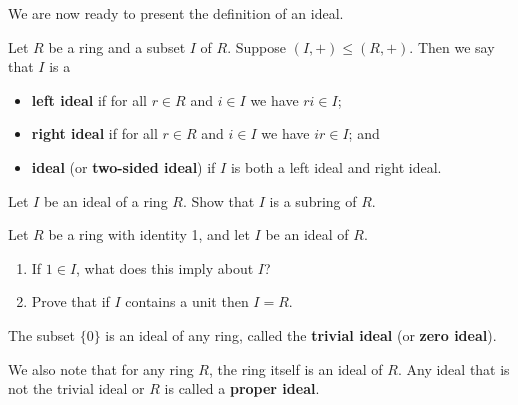 We are now ready to present the definition of an ideal.
\begin{definition}
    Let $R$ be a ring and a subset $I$ of $R$. Suppose $(I,+) \leq (R,+)$. Then we say that $I$ is a
    \begin{itemize}
        \item \textbf{left ideal} if for all $r \in R$ and $i \in I$ we have $ri \in I$;
        \item \textbf{right ideal} if for all $r \in R$ and $i \in I$ we have $ir \in I$; and
        \item \textbf{ideal} (or \textbf{two-sided ideal}) if $I$ is both a left ideal and right ideal.
    \end{itemize} 
\end{definition}
\begin{exercise}\label{exercise-ideal-is-a-subring}
    Let $I$ be an ideal of a ring $R$. Show that $I$ is a subring of $R$.
\end{exercise}
\begin{exercise}\label{exercise-ideal-containing-1-is-whole-ring}
    Let $R$ be a ring with identity 1, and let $I$ be an ideal of $R$.
    \begin{enumerate}[label=(\roman*)]
        \item If $1 \in I$, what does this imply about $I$?
        \item Prove that if $I$ contains a unit then $I = R$.
    \end{enumerate}
\end{exercise}

\begin{example}
    The subset $\{0\}$ is an ideal of any ring, called the \textbf{trivial ideal} (or \textbf{zero ideal}).
\end{example}
We also note that for any ring $R$, the ring itself is an ideal of $R$. Any ideal that is not the trivial ideal or $R$ is called a \textbf{proper ideal}.

